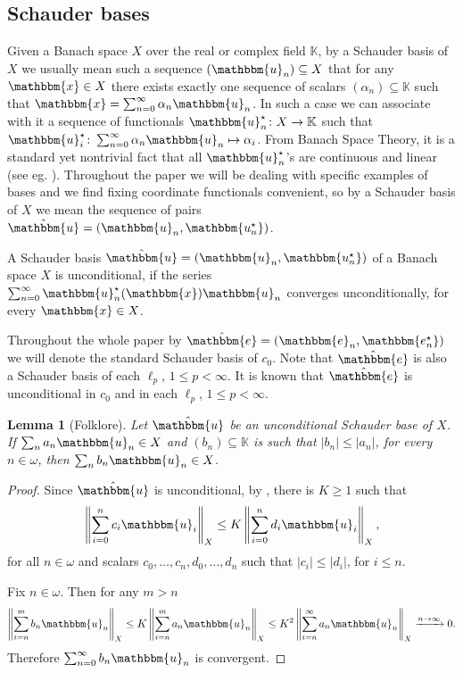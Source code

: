 \documentclass{amsart}
\newcommand{\IK}{\mathbb{K}}
\newcommand{\w}{\mathbbm}
\newtheorem{lemma}[theorem]{Lemma}
\begin{document}
\subsection{Schauder bases}

Given a Banach space $X$ over the real or complex field $\IK$, by a Schauder basis of $X$ we usually mean such a sequence $(\w{u}_n)\subseteq X$ that for any $\w{x}\in X$ there exists exactly one sequence of scalars $(\alpha_n)\subseteq \IK$ such that $\w{x}= \sum_{n=0}^{\infty} \alpha_n \w{u}_n$. In such a case we can associate with it a sequence of functionals $\w{u}_n^\star \colon X \to \IK $ such that $\w{u}_i^\star \colon \sum_{n=0}^{\infty} \alpha_n \w{u}_n \mapsto \alpha_i$. From Banach Space Theory, it is a standard yet nontrivial fact that all $\w{u}_n^\star$'s are continuous and linear (see eg. \cite[Theorem 1.1.3]{AK}). Throughout the paper we will be dealing with specific examples of bases and we find fixing coordinate functionals convenient, so by a Schauder basis of $X$ we mean the sequence of pairs $\hat{\w{u}}=(\w{u}_n,\w{u_n^\star})$.

A Schauder basis $\hat{\w{u}}=(\w{u}_n,\w{u_n^\star})$ of a Banach space $X$ is unconditional, if the series $\sum_{n=0}^{\infty} \w{u}_n^\star(\w{x}) \w{u}_n$ converges unconditionally, for every $\w{x}\in X$.

Throughout the whole paper by $\hat{\w{e}}=(\w{e}_n,\w{e_n^\star})$ we will denote the standard Schauder basis of $c_0$. Note that $\hat{\w{e}}$ is also a Schauder basis of each $\ell_p$, $1\leq p<\infty$. It is known that $\hat{\w{e}}$ is unconditional in $c_0$ and in each $\ell_p$, $1\leq p<\infty$.


\begin{lemma}[Folklore]
\label{lem-monotonicznosc}
Let $\hat{\w{u}}$ be an unconditional Schauder base of $X$. If $\sum_n a_n \w{u}_n\in X$ and $(b_n)\subseteq \IK$ is such that $|b_n|\leq |a_n|$, for every $n \in \omega$, then $\sum_n b_n \w{u}_n \in X$.
\end{lemma}

\begin{proof}
Since $\hat{\w{u}}$ is unconditional, by \cite[Proposition 3.1.3]{AK}, there is $K\geq 1$ such that
    \[
    \left\| \sum_{i=0}^n c_i \w{u}_i \right\|_X \leq K \left\| \sum_{i=0}^n d_i \w{u}_i \right\|_X,
\]
for all $n\in\omega$ and scalars $c_0,\ldots,c_n,d_0,\ldots,d_n$ such that $|c_i|\leq |d_i|$, for $i\leq n$.

Fix $n\in\omega$. Then for any $m>n$ 
    \[
    \left\| \sum_{i=n}^m b_n \w{u}_n \right\|_X \leq K \left\| \sum_{i=n}^m a_n \w{u}_n \right\|_X \leq  K^2 \left\| \sum_{i=n}^\infty a_n \w{u}_n \right\|_X \xrightarrow{n \to \infty} 0.
\]
Therefore $ \sum_{n=0}^\infty b_n \w{u}_n  $ is convergent.
\end{proof}
\end{document}
